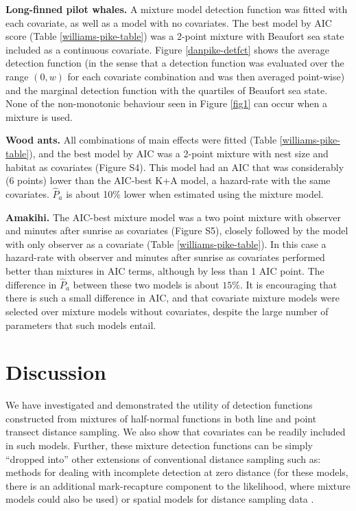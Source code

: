 \documentclass[10pt]{article}
\begin{document}
\textbf{Long-finned pilot whales.} A mixture model detection function was fitted with each covariate, as well as a model with no covariates. The best model by AIC score (Table \ref{williams-pike-table}) was a 2-point mixture with Beaufort sea state included as a continuous covariate. Figure \ref{danpike-detfct} shows the average detection function (in the sense that a detection function was evaluated over the range $(0,w)$ for each covariate combination and was then averaged point-wise) and the marginal detection function with the quartiles of Beaufort sea state. None of the non-monotonic behaviour seen in Figure \ref{fig1} can occur when a mixture is used.

\textbf{Wood ants.} All combinations of main effects were fitted (Table \ref{williams-pike-table}), and the best model by AIC was a 2-point mixture with nest size and habitat as covariates (Figure S4). This model had an AIC that was considerably (6 points) lower than the AIC-best K+A model, a hazard-rate with the same covariates.  $\hat{P}_a$ is about 10\% lower when estimated using the mixture model.

\textbf{Amakihi.} The AIC-best mixture model was a two point mixture with observer and minutes after sunrise as covariates (Figure S5), closely followed by the model with only observer as a covariate (Table \ref{williams-pike-table}). In this case a hazard-rate with observer and minutes after sunrise as covariates performed better than mixtures in AIC terms, although by less than 1 AIC point. The difference in $\hat{P}_a$ between these two models is about $15\%$.  It is encouraging that there is such a small difference in AIC, and that covariate mixture models were selected over mixture models without covariates, despite the large number of parameters that such models entail.


\section*{Discussion}

We have investigated and demonstrated the utility of detection functions constructed from mixtures of half-normal functions in both line and point transect distance sampling. We also show that covariates can be readily included in such models. Further, these mixture detection functions can be simply ``dropped into'' other extensions of conventional distance sampling such as: methods for dealing with incomplete detection at zero distance \cite{Laake:2004tz, Laake:2011vm} (for these models, there is an additional mark-recapture component to the likelihood, where mixture models could also be used) or spatial models for distance sampling data \cite{Hedley:2004et, Miller:2013us}.
\end{document}
